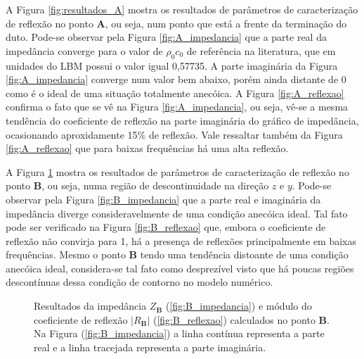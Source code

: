 \newpage
A Figura \ref{fig:resultados_A} mostra os resultados de parâmetros de caracterização de reflexão no ponto \textbf{A}, ou seja, num ponto que está a frente da terminação do duto. Pode-se observar pela Figura \ref{fig:A_impedancia} que a parte real da impedância converge para o valor de $\rho_{0} c_{0}$ de referência na literatura, que em unidades do LBM possui o valor igual 0,57735. A parte imaginária da Figura \ref{fig:A_impedancia} converge num valor bem abaixo, porém ainda distante de 0 como é o ideal de uma situação totalmente anecóica. A Figura \ref{fig:A_reflexao} confirma o fato que se vê na Figura \ref{fig:A_impedancia}, ou seja, vê-se a mesma tendência do coeficiente de reflexão na parte imaginária do gráfico de impedância, ocasionando aproxidamente 15\% de reflexão. Vale ressaltar também da Figura \ref{fig:A_reflexao} que para baixas frequências há uma alta reflexão. 

A Figura \ref{fig:resultados_B} mostra os resultados de parâmetros de caracterização de reflexão no ponto \textbf{B}, ou seja, numa região de descontinuidade na direção $z$ e $y$. Pode-se observar pela Figura \ref{fig:B_impedancia} que a parte real e imaginária da impedância diverge consideravelmente de uma condição anecóica ideal. Tal fato pode ser verificado na Figura \ref{fig:B_reflexao} que, embora o coeficiente de reflexão não convirja para 1, há a presença de reflexões principalmente em baixas frequências. Mesmo o ponto \textbf{B} tendo uma tendência distoante de uma condição anecóica ideal, considera-se tal fato como desprezível visto que há poucas regiões descontínuas dessa condição de contorno no modelo numérico.   

\begin{figure}
\begin{subfigure}{\scaleA \textwidth}
  
\end{subfigure}%
\begin{subfigure}{\scaleA \textwidth}
  
\end{subfigure}
\caption[Resultados de reflexão no ponto \textbf{B}]{Resultados da impedância $Z_{\textbf{B}}$ (\ref{fig:B_impedancia}) e módulo do coeficiente de reflexão $|R_{\textbf{B}}|$ (\ref{fig:B_reflexao}) calculados no ponto $\textbf{B}$. Na Figura (\ref{fig:B_impedancia}) a linha contínua representa a parte real e a linha tracejada representa a parte imaginária.}
\label{fig:resultados_B}
\end{figure}

